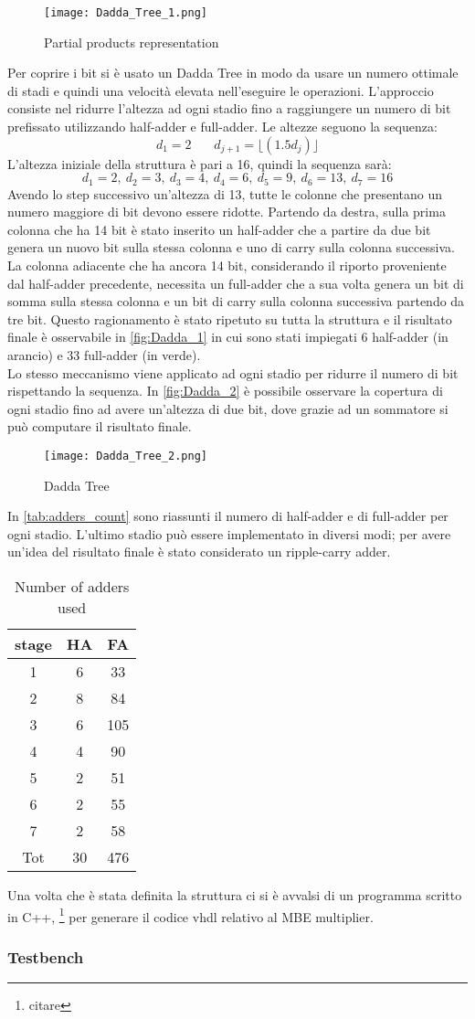 \begin{figure}[htb]
	\center
	\texttt{[image: Dadda\_Tree\_1.png]}
	\caption{Partial products representation}
	\label{fig:Dadda_1}
\end{figure}
Per coprire i bit si è usato un Dadda Tree in modo da usare un numero ottimale di stadi e quindi una velocità elevata nell'eseguire le operazioni. L'approccio consiste nel ridurre l'altezza ad ogni stadio fino a raggiungere un numero di bit prefissato utilizzando half-adder e full-adder. Le altezze seguono la sequenza:
$$
d_1 = 2 \ \ \ \ \ \ \ \ d_{j+1} = \lfloor(1.5d_j)\rfloor
$$
L'altezza iniziale della struttura è pari a 16, quindi la sequenza sarà:
$$
d_1 = 2,\ d_2 = 3,\ d_3 = 4,\ 
d_4 = 6,\ d_5 = 9,\ d_6 = 13,\ d_7 = 16
$$
Avendo lo step successivo un'altezza di 13, tutte le colonne che presentano un numero maggiore di bit devono essere ridotte. Partendo da destra, sulla prima colonna che ha 14 bit è stato inserito un half-adder che a partire da due bit genera un nuovo bit sulla stessa colonna e uno di carry sulla colonna successiva. La colonna adiacente che ha ancora 14 bit, considerando il riporto proveniente dal half-adder precedente, necessita un full-adder che a sua volta genera un bit di somma sulla stessa colonna e un bit di carry sulla colonna successiva partendo da tre bit. Questo ragionamento è stato ripetuto su tutta la struttura e il risultato finale è osservabile in \autoref{fig:Dadda_1} in cui sono stati impiegati 6 half-adder (in arancio) e 33 full-adder (in verde).\\
Lo stesso meccanismo viene applicato ad ogni stadio per ridurre il numero di bit rispettando la sequenza. In \autoref{fig:Dadda_2} è possibile osservare la copertura di ogni stadio fino ad avere un'altezza di due bit, dove grazie ad un sommatore si può computare il risultato finale. 

\begin{figure}[htb]
	\center
	\texttt{[image: Dadda\_Tree\_2.png]}
	\caption{Dadda Tree }
	\label{fig:Dadda_2}
\end{figure}

In \autoref{tab:adders_count} sono riassunti il numero di half-adder e di full-adder per ogni stadio. L'ultimo stadio può essere implementato in diversi modi; per avere un'idea del risultato finale è stato considerato un ripple-carry adder.
\begin{table}[htb]
	\centering
	\begin{tabular}{ccc}
		stage & HA & FA \\ 
		\hline 
		1 & 6 & 33\\ 
		2 & 8 & 84\\ 
		3 & 6 & 105\\ 
		4 & 4 & 90\\ 
		5 & 2 & 51\\ 
		6 & 2 & 55\\ 
		7 & 2 & 58\\ 
		Tot & 30 & 476\\ 
	\end{tabular}  
	\label{tab:adders_count}
	\caption{Number of adders used}
\end{table}

Una volta che è stata definita la struttura ci si è avvalsi di un programma scritto in C++, \footnote{citare} per generare il codice vhdl relativo al MBE multiplier.
\subsubsection{Testbench}
